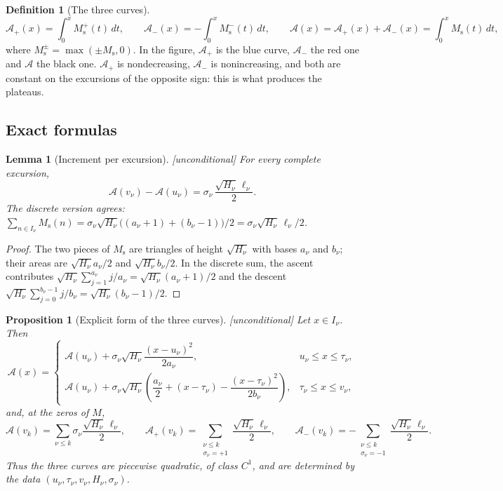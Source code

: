 \documentclass[11pt,reqno]{amsart}
\theoremstyle{plain}
\newtheorem{proposition}[theorem]{Proposition}
\newtheorem{lemma}[theorem]{Lemma}
\theoremstyle{definition}
\newtheorem{definition}[theorem]{Definition}
\newcommand{\Ms}{M_{\mathrm{s}}}
\newcommand{\Ap}{\mathcal{A}_{+}}
\newcommand{\Am}{\mathcal{A}_{-}}
\newcommand{\Anet}{\mathcal{A}}
\begin{document}
\begin{definition}[The three curves]
\label{def:areas}
\[
  \Ap(x)=\int_0^x \Ms^{+}(t)\,dt,\qquad
  \Am(x)=-\int_0^x \Ms^{-}(t)\,dt,\qquad
  \Anet(x)=\Ap(x)+\Am(x)=\int_0^x \Ms(t)\,dt,
\]
where $\Ms^{\pm}=\max(\pm \Ms,0)$. In the figure, $\Ap$ is the blue curve,
$\Am$ the red one and $\Anet$ the black one. $\Ap$ is nondecreasing, $\Am$ is
nonincreasing, and both are constant on the excursions of the opposite sign:
this is what produces the plateaus.
\end{definition}

\subsection{Exact formulas}
\label{subsec:formulas}

\begin{lemma}[Increment per excursion]
\label{lem:jump}
\emph{[unconditional]} For every complete excursion,
\[
  \Anet(v_\nu)-\Anet(u_\nu)=\sigma_\nu\,\frac{\sqrt{H_\nu}\,\ell_\nu}{2}.
\]
The discrete version agrees: $\sum_{n\in I_\nu}\Ms(n)
=\sigma_\nu\sqrt{H_\nu}\bigl((a_\nu+1)+(b_\nu-1)\bigr)/2
=\sigma_\nu\sqrt{H_\nu}\,\ell_\nu/2$.
\end{lemma}

\begin{proof}
The two pieces of $\Ms$ are triangles of height $\sqrt{H_\nu}$ with bases
$a_\nu$ and $b_\nu$; their areas are $\sqrt{H_\nu}a_\nu/2$ and
$\sqrt{H_\nu}b_\nu/2$. In the discrete sum, the ascent contributes
$\sqrt{H_\nu}\sum_{j=1}^{a_\nu}j/a_\nu=\sqrt{H_\nu}(a_\nu+1)/2$ and the
descent $\sqrt{H_\nu}\sum_{j=0}^{b_\nu-1}j/b_\nu=\sqrt{H_\nu}(b_\nu-1)/2$.
\end{proof}

\begin{proposition}[Explicit form of the three curves]
\label{prop:explicit}
\emph{[unconditional]} Let $x\in I_\nu$. Then
\[
  \Anet(x)=
  \begin{cases}
    \Anet(u_\nu)+\sigma_\nu\sqrt{H_\nu}\dfrac{(x-u_\nu)^2}{2a_\nu},
      & u_\nu\le x\le\tau_\nu,\\[2.4ex]
    \Anet(u_\nu)+\sigma_\nu\sqrt{H_\nu}
      \left(\dfrac{a_\nu}{2}+(x-\tau_\nu)-\dfrac{(x-\tau_\nu)^2}{2b_\nu}\right),
      & \tau_\nu\le x\le v_\nu,
  \end{cases}
\]
and, at the zeros of $M$,
\[
  \Anet(v_k)=\sum_{\nu\le k}\sigma_\nu\frac{\sqrt{H_\nu}\,\ell_\nu}{2},
  \qquad
  \Ap(v_k)=\sum_{\substack{\nu\le k\\ \sigma_\nu=+1}}\frac{\sqrt{H_\nu}\,\ell_\nu}{2},
  \qquad
  \Am(v_k)=-\sum_{\substack{\nu\le k\\ \sigma_\nu=-1}}\frac{\sqrt{H_\nu}\,\ell_\nu}{2}.
\]
Thus the three curves are piecewise quadratic, of class $C^1$, and are
determined by the data $(u_\nu,\tau_\nu,v_\nu,H_\nu,\sigma_\nu)$.
\end{proposition}
\end{document}
